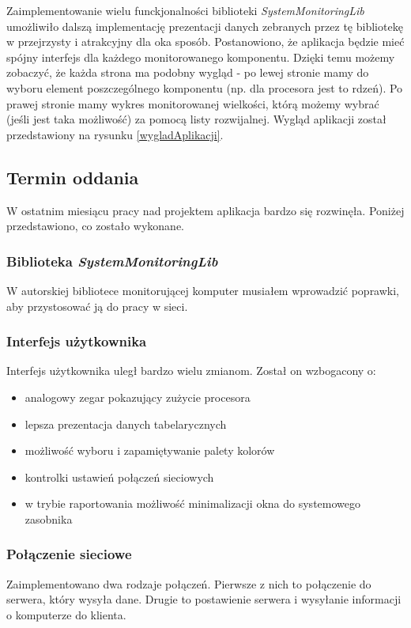 \documentclass[a4paper]{article}
\begin{document}
Zaimplementowanie wielu funckjonalności biblioteki \textit{SystemMonitoringLib} umożliwiło dalszą implementację
prezentacji danych zebranych przez tę bibliotekę w przejrzysty i atrakcyjny dla oka sposób. Postanowiono, że aplikacja
będzie mieć spójny interfejs dla każdego monitorowanego komponentu. Dzięki temu możemy zobaczyć, że każda strona ma podobny wygląd - po lewej stronie mamy do wyboru element poszczególnego komponentu (np. dla procesora jest to rdzeń). Po prawej stronie mamy wykres monitorowanej wielkości, którą możemy wybrać (jeśli jest taka możliwość) za pomocą listy rozwijalnej. Wygląd aplikacji został przedstawiony na rysunku \ref{wygladAplikacji}.

\subsection{Termin oddania}


W ostatnim miesiącu pracy nad projektem aplikacja bardzo się rozwinęła. Poniżej przedstawiono, co zostało wykonane.

\subsubsection{Biblioteka \textit{SystemMonitoringLib}}
W autorskiej bibliotece monitorującej komputer musiałem wprowadzić poprawki, aby przystosować ją
do pracy w sieci. 

\subsubsection{Interfejs użytkownika}
Interfejs użytkownika uległ bardzo wielu zmianom. Został on wzbogacony o:
\begin{itemize}
	\item analogowy zegar pokazujący zużycie procesora
	\item lepsza prezentacja danych tabelarycznych
	\item możliwość wyboru i zapamiętywanie palety kolorów
	\item kontrolki ustawień połączeń sieciowych
	\item w trybie raportowania możliwość minimalizacji okna do systemowego zasobnika
\end{itemize}

\subsubsection{Połączenie sieciowe}
Zaimplementowano dwa rodzaje połączeń. Pierwsze z nich to połączenie do serwera, który wysyła dane. Drugie to postawienie serwera i wysyłanie informacji o komputerze do klienta.
\end{document}
